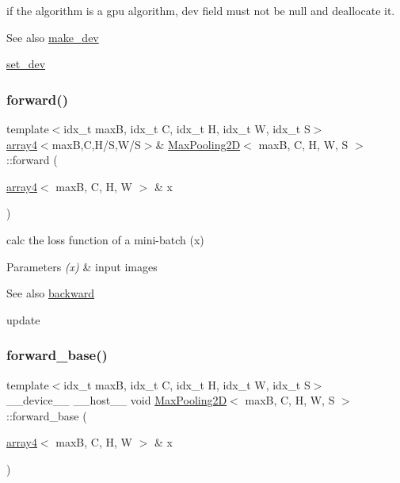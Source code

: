if the algorithm is a gpu algorithm, dev field must not be null and deallocate it. 

\begin{DoxySeeAlso}{See also}
\hyperlink{structMaxPooling2D_a2cb8392bfcf78dc55e7157ef3095364e}{make\+\_\+dev} 

\hyperlink{structMaxPooling2D_ab534c745a6fbfac5a8bd1718a1510dbe}{set\+\_\+dev} 
\end{DoxySeeAlso}
\mbox{\label{structMaxPooling2D_ac533b4e08d8f2e708bbdc8f8e2d784a2}} 
\subsubsection{\texorpdfstring{forward()}{forward()}}
{\footnotesize\ttfamily template$<$idx\+\_\+t maxB, idx\+\_\+t C, idx\+\_\+t H, idx\+\_\+t W, idx\+\_\+t S$>$ \\
\hyperlink{structarray4}{array4}$<$maxB,C,H/S,W/S$>$\& \hyperlink{structMaxPooling2D}{Max\+Pooling2D}$<$ maxB, C, H, W, S $>$\+::forward (\begin{DoxyParamCaption}\item[{\hyperlink{structarray4}{array4}$<$ maxB, C, H, W $>$ \&}]{x }\end{DoxyParamCaption})\hspace{0.3cm}{\ttfamily [inline]}}



calc the loss function of a mini-\/batch (x) 


\begin{DoxyParams}{Parameters}
{\em (x)} & input images \\
\hline
\end{DoxyParams}
\begin{DoxySeeAlso}{See also}
\hyperlink{structMaxPooling2D_ae0ad0f868dcf5f976f4dd99dd91e2f91}{backward} 

update 
\end{DoxySeeAlso}
\mbox{\label{structMaxPooling2D_adde941f72d6c91ecb63253afb845dbfa}} 
\subsubsection{\texorpdfstring{forward\+\_\+base()}{forward\_base()}}
{\footnotesize\ttfamily template$<$idx\+\_\+t maxB, idx\+\_\+t C, idx\+\_\+t H, idx\+\_\+t W, idx\+\_\+t S$>$ \\
\+\_\+\+\_\+device\+\_\+\+\_\+ \+\_\+\+\_\+host\+\_\+\+\_\+ void \hyperlink{structMaxPooling2D}{Max\+Pooling2D}$<$ maxB, C, H, W, S $>$\+::forward\+\_\+base (\begin{DoxyParamCaption}\item[{\hyperlink{structarray4}{array4}$<$ maxB, C, H, W $>$ \&}]{x }\end{DoxyParamCaption})\hspace{0.3cm}{\ttfamily [inline]}}



